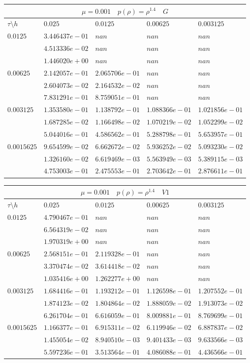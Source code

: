 \documentclass[a4paper,12pt]{extarticle}
\begin{document}
\begin{tabular}{|l|l|l|l|l|}
	\hline
	\multicolumn{5}{|c|}{$\mu =0.001 \quad  p(\rho) = \rho^{1.4} \quad G$}\\
	\hline
	$\tau\setminus h$ & $0.025$ & $0.0125$ & $0.00625$ & $0.003125$\\
	\hline
	$0.0125$  & $3.446437e-01$ & $nan$ & $nan$ & $nan$\\
	& $4.513336e-02$ & $nan$ & $nan$ & $nan$\\
	& $1.446020e+00$ & $nan$ & $nan$ & $nan$\\
	\hline
	$0.00625$  & $2.142057e-01$ & $2.065706e-01$ & $nan$ & $nan$\\
	& $2.604073e-02$ & $2.164532e-02$ & $nan$ & $nan$\\
	& $7.831291e-01$ & $8.759051e-01$ & $nan$ & $nan$\\
	\hline
	$0.003125$  & $1.353580e-01$ & $1.138792e-01$ & $1.088366e-01$ & $1.021856e-01$\\
	& $1.687285e-02$ & $1.166498e-02$ & $1.070219e-02$ & $1.052299e-02$\\
	& $5.044016e-01$ & $4.586562e-01$ & $5.288798e-01$ & $5.653957e-01$\\
	\hline
	$0.0015625$  & $9.654599e-02$ & $6.662672e-02$ & $5.936252e-02$ & $5.093230e-02$\\
	& $1.326160e-02$ & $6.619469e-03$ & $5.563949e-03$ & $5.389115e-03$\\
	& $4.753003e-01$ & $2.475553e-01$ & $2.703642e-01$ & $2.876611e-01$\\
	\hline
\end{tabular}

\begin{tabular}{|l|l|l|l|l|}
	\hline
	\multicolumn{5}{|c|}{$\mu =0.001 \quad  p(\rho) = \rho^{1.4} \quad V1$}\\
	\hline
	$\tau\setminus h$ & $0.025$ & $0.0125$ & $0.00625$ & $0.003125$\\
	\hline
	$0.0125$  & $4.790467e-01$ & $nan$ & $nan$ & $nan$\\
	& $6.564319e-02$ & $nan$ & $nan$ & $nan$\\
	& $1.970319e+00$ & $nan$ & $nan$ & $nan$\\
	\hline
	$0.00625$  & $2.568151e-01$ & $2.119328e-01$ & $nan$ & $nan$\\
	& $3.370474e-02$ & $3.614418e-02$ & $nan$ & $nan$\\
	& $1.035416e+00$ & $1.262277e+00$ & $nan$ & $nan$\\
	\hline
	$0.003125$  & $1.684416e-01$ & $1.193212e-01$ & $1.126598e-01$ & $1.207552e-01$\\
	& $1.874123e-02$ & $1.804864e-02$ & $1.888059e-02$ & $1.913073e-02$\\
	& $6.261704e-01$ & $6.616059e-01$ & $8.009881e-01$ & $8.769699e-01$\\
	\hline
	$0.0015625$  & $1.166377e-01$ & $6.915311e-02$ & $6.119946e-02$ & $6.887837e-02$\\
	& $1.455054e-02$ & $8.940510e-03$ & $9.401433e-03$ & $9.633566e-03$\\
	& $5.597236e-01$ & $3.513564e-01$ & $4.086088e-01$ & $4.436566e-01$\\
	\hline
\end{tabular}
\end{document}
